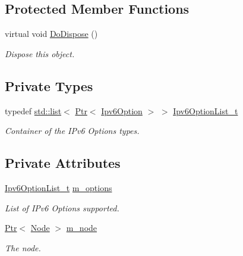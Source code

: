 \subsection*{Protected Member Functions}
\begin{DoxyCompactItemize}
\item 
virtual void \hyperlink{classns3_1_1Ipv6OptionDemux_a907bc1fc030d86c0f5a813d1a9ecf5f1}{Do\+Dispose} ()
\begin{DoxyCompactList}\small\item\em Dispose this object. \end{DoxyCompactList}\end{DoxyCompactItemize}
\subsection*{Private Types}
\begin{DoxyCompactItemize}
\item 
typedef \hyperlink{openflow-interface_8h_afd9bcfa176617760671b67580f536fa7}{std\+::list}$<$ \hyperlink{classns3_1_1Ptr}{Ptr}$<$ \hyperlink{classns3_1_1Ipv6Option}{Ipv6\+Option} $>$ $>$ \hyperlink{classns3_1_1Ipv6OptionDemux_a9046347408a082815c80cf859487fb3e}{Ipv6\+Option\+List\+\_\+t}
\begin{DoxyCompactList}\small\item\em Container of the I\+Pv6 Options types. \end{DoxyCompactList}\end{DoxyCompactItemize}
\subsection*{Private Attributes}
\begin{DoxyCompactItemize}
\item 
\hyperlink{classns3_1_1Ipv6OptionDemux_a9046347408a082815c80cf859487fb3e}{Ipv6\+Option\+List\+\_\+t} \hyperlink{classns3_1_1Ipv6OptionDemux_abf65e5e695f571ff6c28d28ea32ce206}{m\+\_\+options}
\begin{DoxyCompactList}\small\item\em List of I\+Pv6 Options supported. \end{DoxyCompactList}\item 
\hyperlink{classns3_1_1Ptr}{Ptr}$<$ \hyperlink{classns3_1_1Node}{Node} $>$ \hyperlink{classns3_1_1Ipv6OptionDemux_a35cb2392909c020aef1e24255f7cd816}{m\+\_\+node}
\begin{DoxyCompactList}\small\item\em The node. \end{DoxyCompactList}\end{DoxyCompactItemize}

